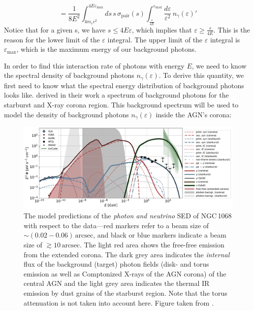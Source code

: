 \begin{equation}
    =  \frac{1}{8E^2}\int_{4m_ec^2}^{4E\varepsilon_{\max}}ds\,s\,\sigma_{\text{pair}}(s)\int_{\frac{s}{4E}}^{\varepsilon_{\max}}\frac{d\varepsilon}{\varepsilon^2}\,n_{\gamma}(\varepsilon)'
    \label{eq:interaction_rate_third_one}
\end{equation}
Notice that for a given s, we have $s \leq 4E\varepsilon$, which implies that $\varepsilon \geq \frac{s}{4E}$. This is the reason for the lower limit of the $\varepsilon$ integral. The upper limit of the $\varepsilon$ integral is $\varepsilon_{\max}$, which is the maximum energy of our background photons.

In order to find this interaction rate of photons with energy $E$, we need to know the spectral density of background photons $n_{\gamma}(\varepsilon)$. To derive this quantity, we first need to know what the spectral energy distribution of background photons looks like. \citet{Eichmann_2022} derived in their work a spectrum of background photons for the starburst and X-ray corona region. This background spectrum will be used to model the density of background photons $n_{\gamma}(\varepsilon)$ inside the AGN's corona:


\begin{figure}[H]
    \includegraphics[width=\textwidth]{Figures/fit5b2_SED_details.pdf}
    \centering
    \caption{The model predictions of the \emph{photon and neutrino} SED of NGC\,1068 with respect to the data---red markers refer to a beam size of $\sim (0.02-0.06)\,\text{arcsec}$, and black or blue markers indicate a beam size of $\gtrsim 10\,\text{arcsec}$. The light red area shows the free-free emission from the extended corona. The dark grey area indicates the \emph{internal} flux of the background (target) photon fields (disk- and torus emission as well as Comptonized X-rays of the AGN corona) of the central AGN and the light grey area indicates the thermal IR emission by dust grains of the starburst region. Note that the torus attenuation is not taken into account here. Figure taken from \citet{Eichmann_2022}.} 
    \label{fig:background_spectral_density}
\end{figure}

